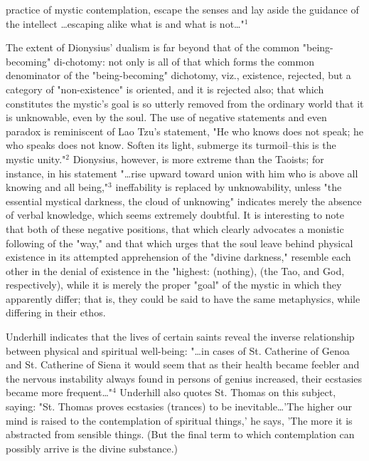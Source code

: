 \noindent practice of mystic contemplation,
escape the senses and lay aside the guidance of the
intellect \dots  escaping alike what is and what is not\dots"$^{1}$\par
\vspace*{0.5\baselineskip}
The extent of Dionysius' dualism is far beyond that of the
common "being-becoming" di-\linebreak chotomy: not only is all of that
which forms the common denominator of the "being-becoming"
dichotomy, viz., existence, rejected, but a category of "non-existence"
is oriented, and it is rejected also; that which
constitutes the mystic's goal is so utterly removed from the
ordinary world that it is unknowable, even by the soul. The
use of negative statements and even paradox is reminiscent
of Lao Tzu's statement, "He who knows does not speak; he who
speaks does not know. Soften its light, submerge its turmoil--this
is the mystic unity."$^{2}$ Dionysius, however, is more
extreme than the Taoists; for instance, in his statement
"\dots rise upward toward union with him who is above all knowing
and all being,"$^{3}$ ineffability is replaced by unknowability,
unless "the essential mystical darkness, the cloud of unknowing"
indicates merely the absence of verbal knowledge,
which seems extremely doubtful. It is interesting to note
that both of these negative positions, that which clearly
advocates a monistic following of the "way," and that which
urges that the soul leave behind physical existence in its
attempted apprehension of the "divine darkness," resemble
each other in the denial of existence in the "highest: (nothing),
(the Tao, and God, respectively), while it is merely
the proper "goal" of the mystic in which they apparently
differ; that is, they could be said to have the same metaphysics,
while differing in their ethos.\par
\vspace*{0.5\baselineskip}
Underhill indicates that the lives of certain saints
reveal the inverse relationship between physical and spiritual
well-being: "\dots in cases of St. Catherine of Genoa
and St. Catherine of Siena it would seem that as their health
became feebler and the nervous instability always found in
persons of genius increased, their ecstasies became more
frequent\dots"$^{4}$ Underhill also quotes St. Thomas on this subject,
saying: "St. Thomas proves ecstasies (trances) to be
inevitable\dots 'The higher our mind is raised to the contemplation
of spiritual things,' he says, 'The more it is abstracted from sensible things.
(But the final term to which contemplation can possibly arrive is the divine substance.)
